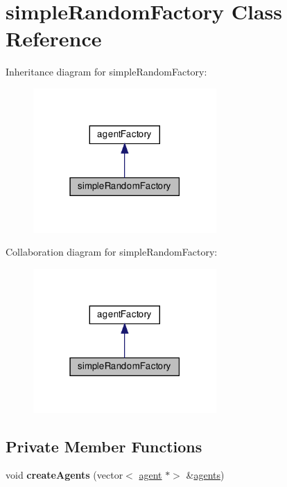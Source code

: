\hypertarget{classsimpleRandomFactory}{}\section{simple\+Random\+Factory Class Reference}
\label{classsimpleRandomFactory}


Inheritance diagram for simple\+Random\+Factory\+:\nopagebreak
\begin{figure}[H]
\begin{center}
\leavevmode
\includegraphics[width=198pt]{classsimpleRandomFactory__inherit__graph}
\end{center}
\end{figure}


Collaboration diagram for simple\+Random\+Factory\+:\nopagebreak
\begin{figure}[H]
\begin{center}
\leavevmode
\includegraphics[width=198pt]{classsimpleRandomFactory__coll__graph}
\end{center}
\end{figure}
\subsection*{Private Member Functions}
\begin{DoxyCompactItemize}
\item 
\mbox{\label{classsimpleRandomFactory_ac781683a570893f0fffef73f0d253aac}} 
void {\bfseries create\+Agents} (vector$<$ \mbox{\hyperlink{classagent}{agent}} $\ast$$>$ \&\mbox{\hyperlink{classagents}{agents}})
\end{DoxyCompactItemize}
